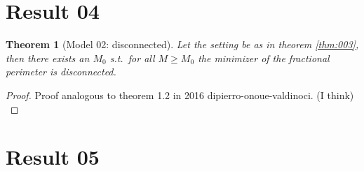 \documentclass[11pt]{article}
\newtheorem{theorem}[definition]{Theorem}
\begin{document}
\section{Result 04}
\label{sec:005}

\begin{theorem}[Model 02: disconnected]
	\label{thm:004}
	Let the setting be as in theorem \cref{thm:003}, then there exists an \( M_0 \)
	s.t.\ for all \( M \geq M_0 \) the minimizer of the fractional perimeter is disconnected.
\end{theorem}
\begin{proof}
	Proof analogous to theorem 1.2 in 2016 dipierro-onoue-valdinoci. (I think) \\
\end{proof}

\section{Result 05}
\label{sec:006}
\end{document}
